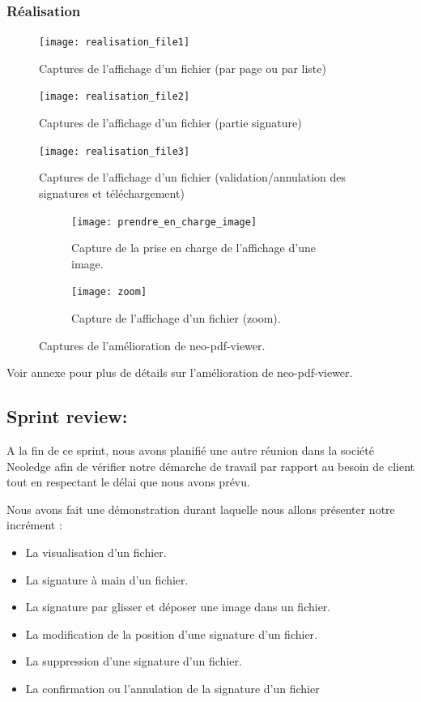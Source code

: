 \subsubsection{Réalisation}

\begin{figure}[H]
  \centering
  \texttt{[image: realisation\_file1]}
  \caption{Captures de l'affichage d'un fichier (par page ou par liste)}
  \label{fig:realisation_file_1}
\end{figure}
\begin{figure}[H]
  \centering
  \texttt{[image: realisation\_file2]}
  \caption{Captures de l'affichage d'un fichier (partie signature)}
  \label{fig:realisation_file_2}
\end{figure}
\begin{figure}[H]
  \centering
  \texttt{[image: realisation\_file3]}
  \caption{Captures de l'affichage d'un fichier (validation/annulation des signatures et téléchargement)}
  \label{fig:realisation_file_3}
\end{figure}

\begin{figure}[H]
  \begin{subfigure}[t]{0.4\textwidth}
  \centering
  \texttt{[image: prendre\_en\_charge\_image]}
  \caption{Capture de la prise en charge de l'affichage d'une image.}
  \label{fig:prendre_en_charge_image}
  \end{subfigure}\hfill
  \begin{subfigure}[t]{0.4\textwidth}
  \centering
  \texttt{[image: zoom]}
  \caption{Capture de l'affichage d'un fichier (zoom).}
  \label{fig:zoom}
  \end{subfigure}
  \caption{Captures de l'amélioration de neo-pdf-viewer.}
\label{fig:zoom_and_image}
\end{figure}

Voir annexe pour plus de détails sur l'amélioration de neo-pdf-viewer.


\subsection{Sprint review:}


A la fin de ce sprint, nous avons planifié une autre réunion dans la société Neoledge  afin de vérifier notre démarche de travail par rapport au besoin de client tout en respectant le délai que nous avons prévu.

Nous avons fait une démonstration durant laquelle nous allons présenter notre incrément :
\begin{itemize}
  \item La visualisation d'un fichier.
  \item La signature à main d'un fichier.
  \item La signature par glisser et déposer une image dans un fichier.
  \item La modification de la position d'une signature d'un fichier.
  \item La suppression d'une signature d'un fichier.
  \item La confirmation ou l'annulation de la signature d'un fichier
\end{itemize}

